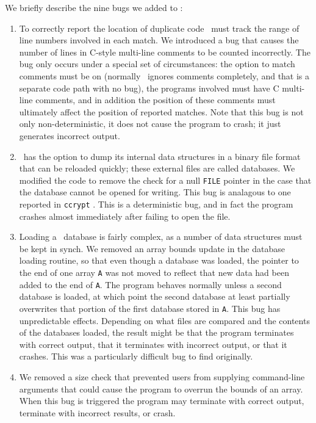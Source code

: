 We briefly describe the nine bugs we added to \moss:
\begin{enumerate}
\item To correctly report the location of duplicate code \moss\ must
track the range of line numbers involved in each match.  We
introduced a bug that causes the number of lines in C-style multi-line
comments to be counted incorrectly.  The bug only occurs under a
special set of circumstances: the option to match comments must be on
(normally \moss\ ignores comments completely, and that is a separate
code path with no bug), the programs involved must have C multi-line
comments, and in addition the position of these comments must
ultimately affect the position of reported matches.  Note that this
bug is not only non-deterministic, it does not cause the program to
crash; it just generates incorrect output.

\item \moss\ has the option to dump its internal data structures in a
binary file format that can be reloaded quickly; these external files
are called databases.  We modified the code to remove the check for a
null {\tt FILE} pointer in the case that the database cannot be opened
for writing.  This bug is analagous to one reported in {\tt ccrypt}
\cite{Selinger:2003:cqual}.  This is a deterministic bug, and in fact the
program crashes almost immediately after failing to open the file.

\item Loading a \moss\ database is fairly complex, as a number of data
structures must be kept in synch.  We removed an array bounds update
in the database loading routine, so that even though a database was
loaded, the pointer to the end of one array {\tt A} was not moved to
reflect that new data had been added to the end of {\tt A}. The
program behaves normally unless a second database is loaded, at which
point the second database at least partially overwrites that portion
of the first database stored in {\tt A}.  This bug has unpredictable
effects.  Depending on what files are compared and the contents of the
databases loaded, the result might be that the program terminates with
correct output, that it terminates with incorrect output, or that it
crashes.  This was a particularly difficult bug to find originally.

\item We removed a size check that prevented users from supplying command-line arguments
that could cause the program to overrun the bounds of an array.  When
this bug is triggered the program may terminate with correct output,
terminate with incorrect results, or crash.



\end{enumerate}
